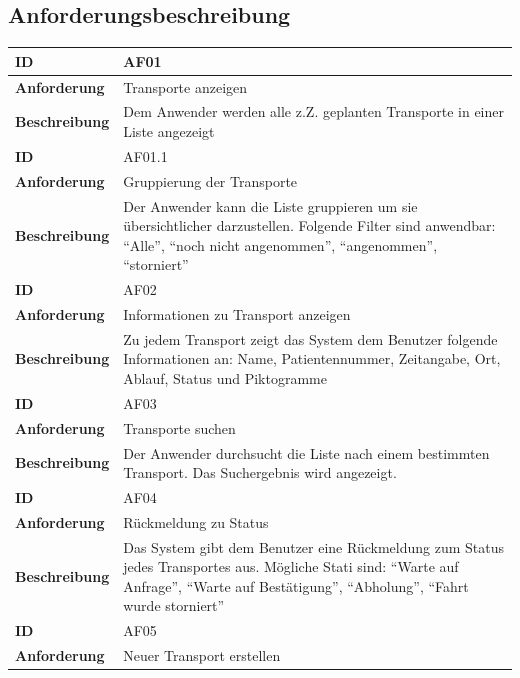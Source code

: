 \documentclass[a4paper, ngerman, 12pt]{scrartcl}
\begin{document}
\subsection{Anforderungsbeschreibung}
\begin{tabular}{|l|p{10cm}|}
\hline
\cellcolor{lightgray}\textbf{ID}&AF01\\
\hline
\cellcolor{lightgray}\textbf{Anforderung}&Transporte anzeigen\\
\hline
\cellcolor{lightgray}\textbf{Beschreibung}&Dem Anwender werden alle z.Z. geplanten Transporte in einer Liste angezeigt\\
\hline
\hline
\cellcolor{lightgray}\textbf{ID}&AF01.1\\
\hline
\cellcolor{lightgray}\textbf{Anforderung}&Gruppierung der Transporte\\
\hline
\cellcolor{lightgray}\textbf{Beschreibung}&Der Anwender kann die Liste gruppieren um sie übersichtlicher darzustellen. Folgende Filter sind anwendbar: ``Alle'', ``noch nicht angenommen'', ``angenommen'', ``storniert''\\
\hline
\hline
\cellcolor{lightgray}\textbf{ID}&AF02\\
\hline
\cellcolor{lightgray}\textbf{Anforderung}&Informationen zu Transport anzeigen\\
\hline
\cellcolor{lightgray}\textbf{Beschreibung}&Zu jedem Transport zeigt das System dem Benutzer folgende Informationen an: Name, Patientennummer, Zeitangabe, Ort, Ablauf, Status und Piktogramme\\
\hline
\hline
\cellcolor{lightgray}\textbf{ID}&AF03\\
\hline
\cellcolor{lightgray}\textbf{Anforderung}&Transporte suchen\\
\hline
\cellcolor{lightgray}\textbf{Beschreibung}&Der Anwender durchsucht die Liste nach einem bestimmten Transport. Das Suchergebnis wird angezeigt.\\
\hline
\hline
\cellcolor{lightgray}\textbf{ID}&AF04\\
\hline
\cellcolor{lightgray}\textbf{Anforderung}&Rückmeldung zu Status\\
\hline
\cellcolor{lightgray}\textbf{Beschreibung}&Das System gibt dem Benutzer eine Rückmeldung zum Status jedes Transportes aus. Mögliche Stati sind: ``Warte auf Anfrage'', ``Warte auf Bestätigung'', ``Abholung'', ``Fahrt wurde storniert''\\
\hline
\hline
\cellcolor{lightgray}\textbf{ID}&AF05\\
\hline
\cellcolor{lightgray}\textbf{Anforderung}&Neuer Transport erstellen\\

\end{tabular}
\end{document}
